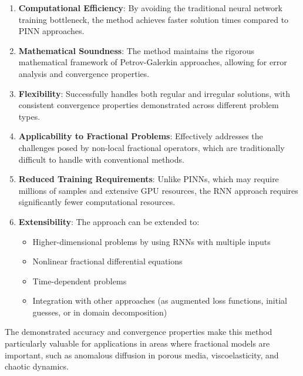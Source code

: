 \documentclass[11pt]{article}
\begin{document}
\begin{enumerate}
    \item \textbf{Computational Efficiency}: By avoiding the traditional neural network training bottleneck, the method achieves faster solution times compared to PINN approaches.
    
    \item \textbf{Mathematical Soundness}: The method maintains the rigorous mathematical framework of Petrov-Galerkin approaches, allowing for error analysis and convergence properties.
    
    \item \textbf{Flexibility}: Successfully handles both regular and irregular solutions, with consistent convergence properties demonstrated across different problem types.
    
    \item \textbf{Applicability to Fractional Problems}: Effectively addresses the challenges posed by non-local fractional operators, which are traditionally difficult to handle with conventional methods.
    
    \item \textbf{Reduced Training Requirements}: Unlike PINNs, which may require millions of samples and extensive GPU resources, the RNN approach requires significantly fewer computational resources.
    
    \item \textbf{Extensibility}: The approach can be extended to:
    \begin{itemize}
        \item Higher-dimensional problems by using RNNs with multiple inputs
        \item Nonlinear fractional differential equations
        \item Time-dependent problems
        \item Integration with other approaches (as augmented loss functions, initial guesses, or in domain decomposition)
    \end{itemize}
\end{enumerate}

The demonstrated accuracy and convergence properties make this method particularly valuable for applications in areas where fractional models are important, such as anomalous diffusion in porous media, viscoelasticity, and chaotic dynamics.
\end{document}
